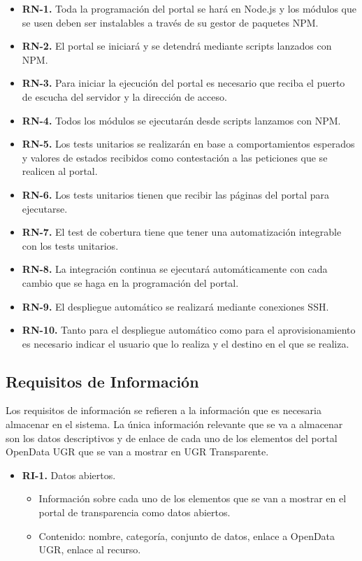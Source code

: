\begin{itemize}
  \item \textbf{RN-1.} Toda la programación del portal se hará en Node.js y los módulos que se usen deben ser instalables a 
  través de su gestor de paquetes NPM.
  \item \textbf{RN-2.} El portal se iniciará y se detendrá mediante scripts lanzados con NPM.
  \item \textbf{RN-3.} Para iniciar la ejecución del portal es necesario que reciba el puerto de escucha del servidor y la 
  dirección de acceso.
  \item \textbf{RN-4.} Todos los módulos se ejecutarán desde scripts lanzamos con NPM.
  \item \textbf{RN-5.} Los tests unitarios se realizarán en base a comportamientos esperados y valores de estados
  recibidos como contestación a las peticiones que se realicen al portal.
  \item \textbf{RN-6.} Los tests unitarios tienen que recibir las páginas del portal para ejecutarse.
  \item \textbf{RN-7.} El test de cobertura tiene que tener una automatización integrable con los tests unitarios. 
  \item \textbf{RN-8.} La integración continua se ejecutará automáticamente con cada cambio que se haga en la programación
  del portal.
  \item \textbf{RN-9.} El despliegue automático se realizará mediante conexiones SSH.
  \item \textbf{RN-10.} Tanto para el despliegue automático como para el aprovisionamiento es necesario indicar el usuario que
  lo realiza y el destino en el que se realiza.
\end{itemize}

\subsection{Requisitos de Información}

Los requisitos de información se refieren a la información que es necesaria almacenar en el sistema. La única información 
relevante que se va a almacenar son los datos descriptivos y de enlace de cada uno de los elementos del portal OpenData UGR 
que se van a mostrar en UGR Transparente.

\begin{itemize}
  \item \textbf{RI-1.} Datos abiertos.
  \begin{itemize}
    \item Información sobre cada uno de los elementos que se van a mostrar en el portal de transparencia como datos abiertos.
    \item Contenido: nombre, categoría, conjunto de datos, enlace a OpenData UGR, enlace al recurso.
  \end{itemize}
\end{itemize}

